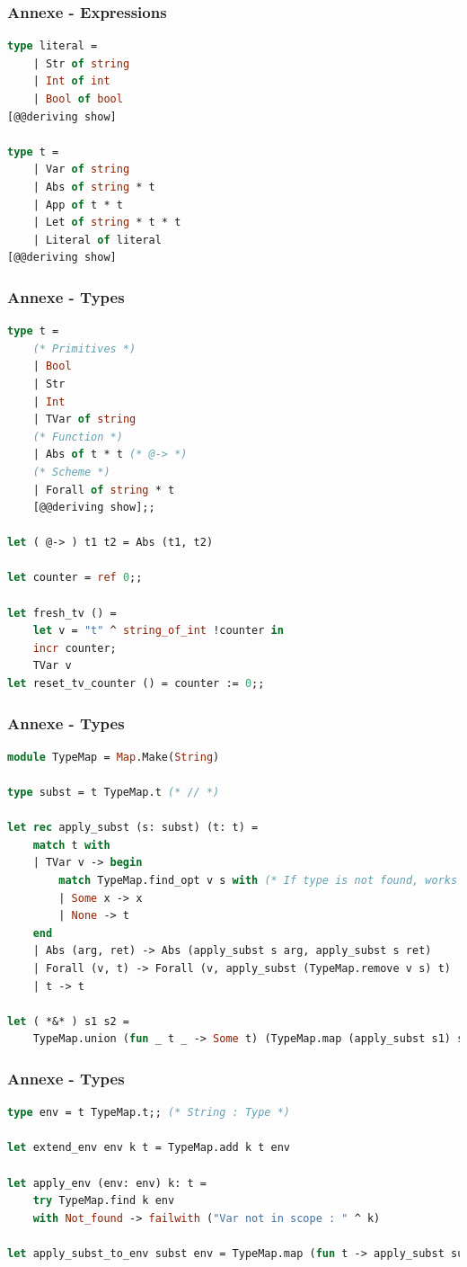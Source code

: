 \documentclass{beamer}
\begin{document}
\begin{frame}[fragile]
		\frametitle{Annexe - Expressions}
		\begin{lstlisting}[language=ML]
type literal =
    | Str of string
    | Int of int
    | Bool of bool
[@@deriving show]

type t =
    | Var of string
    | Abs of string * t
    | App of t * t
    | Let of string * t * t
    | Literal of literal
[@@deriving show]
		\end{lstlisting}
\end{frame}

\begin{frame}[fragile]
		\frametitle{Annexe - Types}
		\begin{lstlisting}[language=ML]
type t =
    (* Primitives *)
    | Bool
    | Str
    | Int
    | TVar of string
    (* Function *)
    | Abs of t * t (* @-> *)
    (* Scheme *)
    | Forall of string * t 
    [@@deriving show];;

let ( @-> ) t1 t2 = Abs (t1, t2)

let counter = ref 0;;

let fresh_tv () =
    let v = "t" ^ string_of_int !counter in
    incr counter;
    TVar v
let reset_tv_counter () = counter := 0;;

		\end{lstlisting}

\end{frame}

\begin{frame}[fragile]
		\frametitle{Annexe - Types}
		\begin{lstlisting}[language=ML]
module TypeMap = Map.Make(String)

type subst = t TypeMap.t (* // *)

let rec apply_subst (s: subst) (t: t) =
    match t with
    | TVar v -> begin
        match TypeMap.find_opt v s with (* If type is not found, works like Id *)
        | Some x -> x
        | None -> t
    end
    | Abs (arg, ret) -> Abs (apply_subst s arg, apply_subst s ret)
    | Forall (v, t) -> Forall (v, apply_subst (TypeMap.remove v s) t)
    | t -> t

let ( *&* ) s1 s2 =
    TypeMap.union (fun _ t _ -> Some t) (TypeMap.map (apply_subst s1) s2) s1
		\end{lstlisting}
\end{frame}

\begin{frame}[fragile]
		\frametitle{Annexe - Types}
		\begin{lstlisting}[language=ML]
type env = t TypeMap.t;; (* String : Type *)

let extend_env env k t = TypeMap.add k t env

let apply_env (env: env) k: t =
    try TypeMap.find k env
    with Not_found -> failwith ("Var not in scope : " ^ k)

let apply_subst_to_env subst env = TypeMap.map (fun t -> apply_subst subst t) env;;
		\end{lstlisting}
\end{frame}
\end{document}
